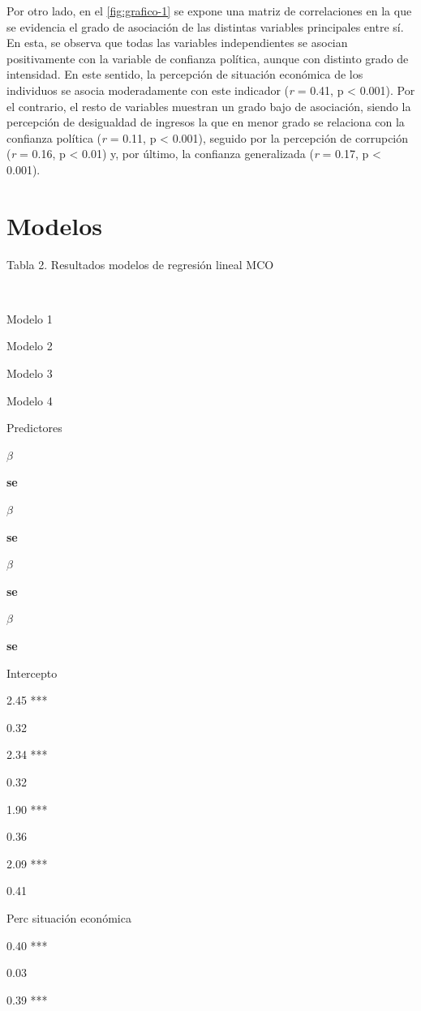 \documentclass[12pt,twoside]{templates/facsothesis}
\begin{document}
Por otro lado, en el \ref{fig:grafico-1} se expone una matriz de correlaciones en la que se evidencia el grado de asociación de las distintas variables principales entre sí. En esta, se observa que todas las variables independientes se asocian positivamente con la variable de confianza política, aunque con distinto grado de intensidad. En este sentido, la percepción de situación económica de los individuos se asocia moderadamente con este indicador (\emph{r} = 0.41, p \textless{} 0.001). Por el contrario, el resto de variables muestran un grado bajo de asociación, siendo la percepción de desigualdad de ingresos la que en menor grado se relaciona con la confianza política (\emph{r} = 0.11, p \textless{} 0.001), seguido por la percepción de corrupción (\emph{r} = 0.16, p \textless{} 0.01) y, por último, la confianza generalizada (\emph{r} = 0.17, p \textless{} 0.001).

\section{Modelos}\label{modelos}

Tabla 2. Resultados modelos de regresión lineal MCO

~

Modelo 1

Modelo 2

Modelo 3

Modelo 4

Predictores

\textbf{\(\beta\)}

\textbf{se}

\textbf{\(\beta\)}

\textbf{se}

\textbf{\(\beta\)}

\textbf{se}

\textbf{\(\beta\)}

\textbf{se}

Intercepto

2.45 ***

0.32

2.34 ***

0.32

1.90 ***

0.36

2.09 ***

0.41

Perc situación económica

0.40 ***

0.03

0.39 ***
\end{document}
